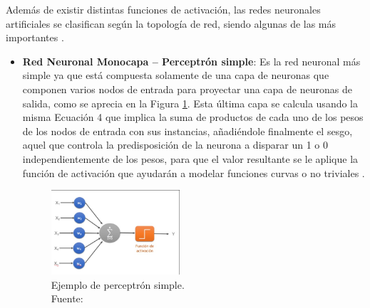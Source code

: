 \begin{itemize}
\begin{itemize}
	\end{itemize}
	
	Además de existir distintas funciones de activación, las redes neuronales artificiales se clasifican según la topología de red, siendo algunas de las más importantes \parencite{gl_calvo2017clasifrna}.
	
	\begin{itemize}
		\item \textbf{Red Neuronal Monocapa – Perceptrón simple}: Es la red neuronal más simple ya que está compuesta solamente de una capa de neuronas que componen varios nodos de entrada para proyectar una capa de neuronas de salida, como se aprecia en la Figura \ref{2:fig20}. Esta última capa se calcula usando la misma Ecuación 4 que implica la suma de productos de cada uno de los pesos de los nodos de entrada con sus instancias, añadiéndole finalmente el sesgo, aquel que controla la predisposición de la neurona a disparar un 1 o 0 independientemente de los pesos, para que el valor resultante se le aplique la función de activación que ayudarán a modelar funciones curvas o no triviales \parencite{gl_mlfa2019redesneuronales}.
		\begin{figure}[h]
			\begin{center}
				\includegraphics[width=0.45\textwidth]{2/figures/perceptron_simple.jpg}
				\caption[Ejemplo de perceptrón simple]{Ejemplo de perceptrón simple.\\
				Fuente: \cite{gl_calvo2017clasifrna}}
				\label{2:fig20}
			\end{center}
		\end{figure}
		

\end{itemize}
\end{itemize}

